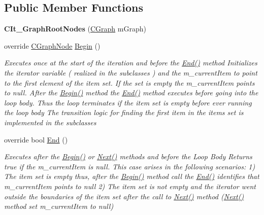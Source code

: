 \subsection*{Public Member Functions}
\begin{DoxyCompactItemize}
\item 
\hypertarget{class_graph_library_1_1_c_it___graph_root_nodes_a67dfd1fbc6fd3de58b1084703f29590f}{}{\bfseries C\+It\+\_\+\+Graph\+Root\+Nodes} (\hyperlink{class_graph_library_1_1_c_graph}{C\+Graph} m\+Graph)\label{class_graph_library_1_1_c_it___graph_root_nodes_a67dfd1fbc6fd3de58b1084703f29590f}

\item 
override \hyperlink{class_graph_library_1_1_c_graph_node}{C\+Graph\+Node} \hyperlink{class_graph_library_1_1_c_it___graph_root_nodes_a582dd6795006075f6f81fef42d1de1ba}{Begin} ()
\begin{DoxyCompactList}\small\item\em Executes once at the start of the iteration and before the \hyperlink{class_graph_library_1_1_c_it___graph_root_nodes_a1173c503776973a5e4f6f51492f21fe5}{End()} method Initializes the iterator variable ( realized in the subclasses ) and the m\+\_\+current\+Item to point to the first element of the item set. If the set is empty the m\+\_\+current\+Item points to null. After the \hyperlink{class_graph_library_1_1_c_it___graph_root_nodes_a582dd6795006075f6f81fef42d1de1ba}{Begin()} method the \hyperlink{class_graph_library_1_1_c_it___graph_root_nodes_a1173c503776973a5e4f6f51492f21fe5}{End()} method executes before going into the loop body. Thus the loop terminates if the item set is empty before ever running the loop body The transition logic for finding the first item in the items set is implemented in the subclasses \end{DoxyCompactList}\item 
override bool \hyperlink{class_graph_library_1_1_c_it___graph_root_nodes_a1173c503776973a5e4f6f51492f21fe5}{End} ()
\begin{DoxyCompactList}\small\item\em Executes after the \hyperlink{class_graph_library_1_1_c_it___graph_root_nodes_a582dd6795006075f6f81fef42d1de1ba}{Begin()} or \hyperlink{class_graph_library_1_1_c_it___graph_root_nodes_a4606ecd1ef26c19634171ccd81e18816}{Next()} methods and before the Loop Body Returns true if the m\+\_\+current\+Item is null. This case arises in the following scenarios\+: 1) The item set is empty thus, after the \hyperlink{class_graph_library_1_1_c_it___graph_root_nodes_a582dd6795006075f6f81fef42d1de1ba}{Begin()} method call the \hyperlink{class_graph_library_1_1_c_it___graph_root_nodes_a1173c503776973a5e4f6f51492f21fe5}{End()} identifies that m\+\_\+current\+Item points to null 2) The item set is not empty and the iterator went outside the boundaries of the item set after the call to \hyperlink{class_graph_library_1_1_c_it___graph_root_nodes_a4606ecd1ef26c19634171ccd81e18816}{Next()} method (\hyperlink{class_graph_library_1_1_c_it___graph_root_nodes_a4606ecd1ef26c19634171ccd81e18816}{Next()} method set m\+\_\+current\+Item to null) \end{DoxyCompactList}\item 

\end{DoxyCompactItemize}

